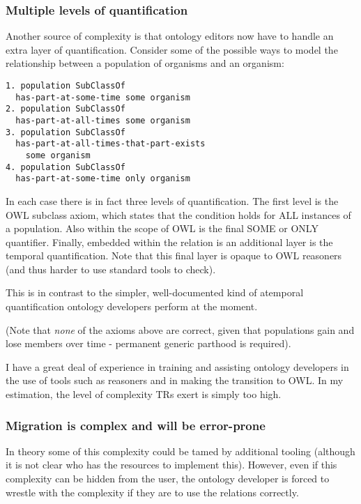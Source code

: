 \documentclass{bioinfo}
\begin{document}
\subsubsection{Multiple levels of quantification}

Another source of complexity is that ontology editors now have to
handle an extra layer of quantification. Consider some of the possible
ways to model the relationship between a population of organisms and
an organism:

\begin{verbatim}
1. population SubClassOf 
  has-part-at-some-time some organism
2. population SubClassOf 
  has-part-at-all-times some organism
3. population SubClassOf 
  has-part-at-all-times-that-part-exists
    some organism
4. population SubClassOf 
  has-part-at-some-time only organism
\end{verbatim}

In each case there is in fact three levels of quantification. The
first level is the OWL subclass axiom, which states that the condition
holds for ALL instances of a population. Also within the scope of OWL
is the final SOME or ONLY quantifier. Finally, embedded within the
relation is an additional layer is the temporal quantification. Note
that this final layer is opaque to OWL reasoners (and thus harder to
use standard tools to check).

This is in contrast to the simpler, well-documented kind of atemporal
quantification ontology developers perform at the moment.

(Note that \emph{none} of the axioms above are correct, given that
populations gain and lose members over time - permanent generic
parthood is required).

I have a great deal of experience in training and assisting ontology
developers in the use of tools such as reasoners and in making the
transition to OWL. In my estimation, the level of complexity TRs exert
is simply too high.

\subsubsection{Migration is complex and will be error-prone}

In theory some of this complexity could be tamed by additional tooling
(although it is not clear who has the resources to implement
this). However, even if this complexity can be hidden from the user,
the ontology developer is forced to wrestle with the complexity if
they are to use the relations correctly.
\end{document}
